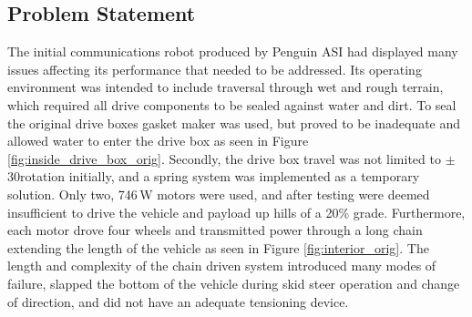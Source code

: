 \subsection{Problem Statement}
The initial communications robot produced by Penguin ASI had displayed many issues affecting its performance that needed to be addressed. Its operating environment was intended to include traversal through wet and rough terrain, which required all drive components to be sealed against water and dirt. To seal the original drive boxes gasket maker was used, but proved to be inadequate and allowed water to enter the drive box as seen in Figure \ref{fig:inside_drive_box_orig}. Secondly, the drive box travel was not limited to $\pm$30\degree rotation initially, and a spring system was implemented as a temporary solution. Only two, 746\,W motors were used, and after testing were deemed insufficient to drive the vehicle and payload up hills of a 20\% grade. Furthermore, each motor drove four wheels and transmitted power through a long chain extending the length of the vehicle as seen in Figure \ref{fig:interior_orig}. The length and complexity of the chain driven system introduced many modes of failure, slapped the bottom of the vehicle during skid steer operation and change of direction, and did not have an adequate tensioning device. 
